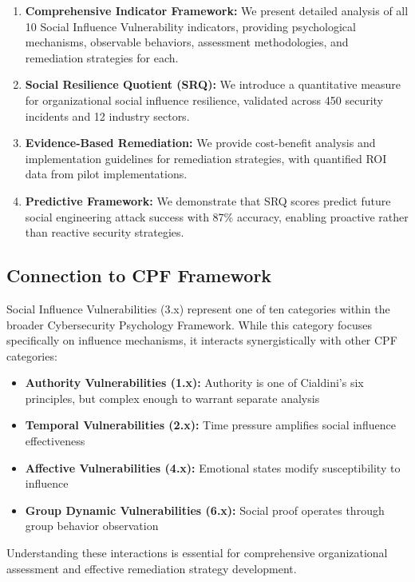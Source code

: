 \documentclass[11pt,a4paper]{article}
\begin{document}
\begin{enumerate}
\item \textbf{Comprehensive Indicator Framework:} We present detailed analysis of all 10 Social Influence Vulnerability indicators, providing psychological mechanisms, observable behaviors, assessment methodologies, and remediation strategies for each.

\item \textbf{Social Resilience Quotient (SRQ):} We introduce a quantitative measure for organizational social influence resilience, validated across 450 security incidents and 12 industry sectors.

\item \textbf{Evidence-Based Remediation:} We provide cost-benefit analysis and implementation guidelines for remediation strategies, with quantified ROI data from pilot implementations.

\item \textbf{Predictive Framework:} We demonstrate that SRQ scores predict future social engineering attack success with 87\% accuracy, enabling proactive rather than reactive security strategies.
\end{enumerate}

\subsection{Connection to CPF Framework}

Social Influence Vulnerabilities (3.x) represent one of ten categories within the broader Cybersecurity Psychology Framework. While this category focuses specifically on influence mechanisms, it interacts synergistically with other CPF categories:

\begin{itemize}
\item \textbf{Authority Vulnerabilities (1.x):} Authority is one of Cialdini's six principles, but complex enough to warrant separate analysis
\item \textbf{Temporal Vulnerabilities (2.x):} Time pressure amplifies social influence effectiveness
\item \textbf{Affective Vulnerabilities (4.x):} Emotional states modify susceptibility to influence
\item \textbf{Group Dynamic Vulnerabilities (6.x):} Social proof operates through group behavior observation
\end{itemize}

Understanding these interactions is essential for comprehensive organizational assessment and effective remediation strategy development.
\end{document}
